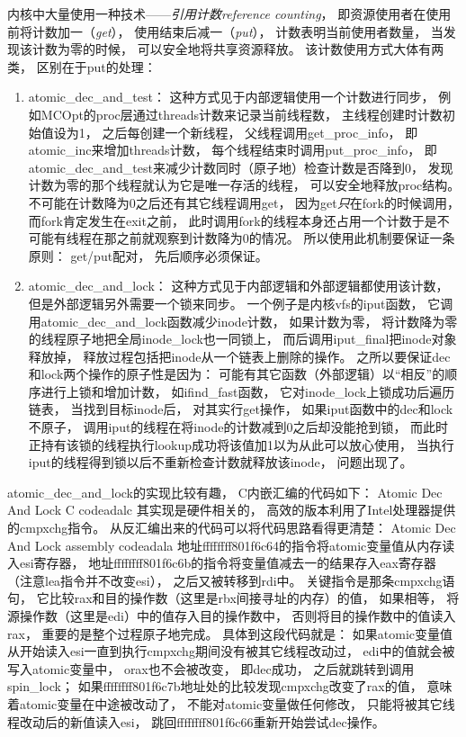\documentclass[11pt]{article}
\begin{document}
内核中大量使用一种技术——{\em 引用计数}{\em reference counting}，
即资源使用者在使用前将计数加一（{\em get}），
使用结束后减一（{\em put}），
计数表明当前使用者数量，
当发现该计数为零的时候，
可以安全地将共享资源释放。
该计数使用方式大体有两类，
区别在于put的处理：
\begin{enumerate}
  \item {atomic\_dec\_and\_test}：
    这种方式见于内部逻辑使用一个计数进行同步，
    例如MCOpt的proc层通过threads计数来记录当前线程数，
    主线程创建时计数初始值设为1，
    之后每创建一个新线程，
    父线程调用get\_proc\_info，
    即atomic\_inc来增加threads计数，
    每个线程结束时调用put\_proc\_info，
    即atomic\_dec\_and\_test来减少计数同时（原子地）检查计数是否降到0，
    发现计数为零的那个线程就认为它是唯一存活的线程，
    可以安全地释放proc结构。
    不可能在计数降为0之后还有其它线程调用get，
    因为get{\em 只}在fork的时候调用，
    而fork肯定发生在exit之前，
    此时调用fork的线程本身还占用一个计数于是不可能有线程在那之前就观察到计数降为0的情况。
    所以使用此机制要保证一条原则：
    get/put配对，
    先后顺序必须保证。

  \item {atomic\_dec\_and\_lock}：
    这种方式见于内部逻辑和外部逻辑都使用该计数，
    但是外部逻辑另外需要一个锁来同步。
    一个例子是内核vfs的iput函数，
    它调用atomic\_dec\_and\_lock函数减少inode计数，
    如果计数为零，
    将计数降为零的线程原子地把全局inode\_lock也一同锁上，
    而后调用iput\_final把inode对象释放掉，
    释放过程包括把inode从一个链表上删除的操作。
    之所以要保证dec和lock两个操作的原子性是因为：
    可能有其它函数（外部逻辑）以``相反''的顺序进行上锁和增加计数，
    如ifind\_fast函数，
    它对inode\_lock上锁成功后遍历链表，
    当找到目标inode后，
    对其实行get操作，
    如果iput函数中的dec和lock不原子，
    调用iput的线程在将inode的计数减到0之后却没能抢到锁，
    而此时正持有该锁的线程执行lookup成功将该值加1以为从此可以放心使用，
    当执行iput的线程得到锁以后不重新检查计数就释放该inode，
    问题出现了。
\end{enumerate}
atomic\_dec\_and\_lock的实现比较有趣，
C内嵌汇编的代码如下：
              {Atomic Dec And Lock C code}{adalc}
其实现是硬件相关的，
高效的版本利用了Intel处理器提供的cmpxchg指令。
从反汇编出来的代码可以将代码思路看得更清楚：
                {Atomic Dec And Lock assembly code}{adala}
地址ffffffff801f6c64的指令将atomic变量值从内存读入esi寄存器，
地址ffffffff801f6c6b的指令将变量值减去一的结果存入eax寄存器%
（注意lea指令并不改变esi），
之后又被转移到rdi中。
关键指令是那条cmpxchg语句，
它比较rax和目的操作数（这里是rbx间接寻址的内存）的值，
如果相等，
将源操作数（这里是edi）中的值存入目的操作数中，
否则将目的操作数中的值读入rax，
重要的是整个过程原子地完成。
具体到这段代码就是：
如果atomic变量值从开始读入esi一直到执行cmpxchg期间没有被其它线程改动过，
edi中的值就会被写入atomic变量中，
orax也不会被改变，
即dec成功，
之后就跳转到调用spin\_lock；
如果ffffffff801f6c7b地址处的比较发现cmpxchg改变了rax的值，
意味着atomic变量在中途被改动了，
不能对atomic变量做任何修改，
只能将被其它线程改动后的新值读入esi，
跳回ffffffff801f6c66重新开始尝试dec操作。
\end{document}
